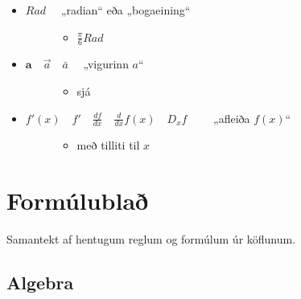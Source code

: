\documentclass[a4paper,10pt,icelandic]{sphinxmanual}
\begin{document}
\begin{itemize}
\begin{description}
\begin{itemize}
\end{itemize}

\end{description}

\item {} \begin{description}
\item[{\(Rad \quad\) „radian“ eða „bogaeining“}] \leavevmode\begin{itemize}
\item {} 
\(\frac{\pi}{6} Rad\)

\end{itemize}

\end{description}

\item {} \begin{description}
\item[{\(\boldsymbol{a} \quad \vec{a} \quad \bar{a}  \quad\) „vigurinn \(a\)“}] \leavevmode\begin{itemize}
\item {} 
sjá  {\hyperref[\detokenize{Kafli08:s-vigrar}]{}}

\end{itemize}

\end{description}

\item {} \begin{description}
\item[{\(f'(x) \quad f' \quad \frac{df}{dx} \quad \frac{d}{dx} f(x) \quad D_x f \qquad\) „afleiða \(f(x)\)“}] \leavevmode\begin{itemize}
\item {} 
með tilliti til \(x\)

\end{itemize}

\end{description}

\end{itemize}


\section{Formúlublað}
\label{\detokenize{Kafli12:formulubla}}
Samantekt af hentugum reglum og formúlum úr köflunum.


\subsection{Algebra}
\label{\detokenize{Kafli12:algebra}}
\end{document}
